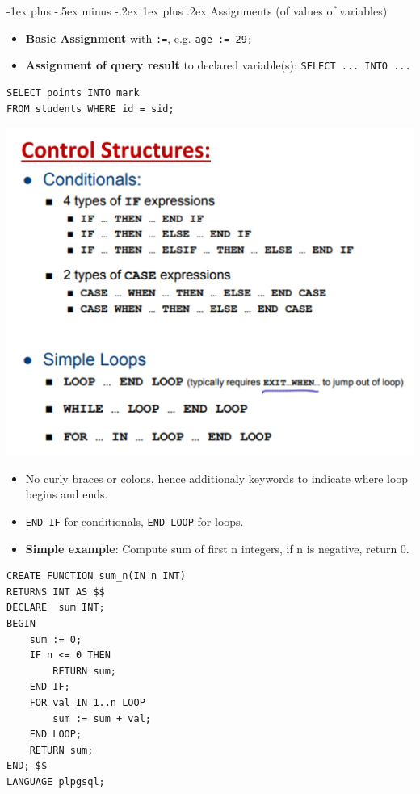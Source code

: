 \documentclass[12pt, landscape]{article}
\makeatletter
\newcommand{\code}[1]{\colorbox{gray!25!}{\lstinline|#1|}}
\renewcommand{\subsubsection}{\@startsection{subsubsection}{3}{0.1mm}%
                                {-1ex plus -.5ex minus -.2ex}%
                                {1ex plus .2ex}%
                                {\normalfont\small\bfseries}}
\makeatother
\begin{document}
\begin{multicols*}{3}
\subsubsection{Assignments (of values of variables)}
\begin{itemize}
\item \textbf{Basic Assignment} with \code{:=}, e.g. \code{age := 29;}
\item \textbf{Assignment of query result} to declared variable(s): \code{SELECT ... INTO ...}
\end{itemize}
\begin{lstlisting}
SELECT points INTO mark 
FROM students WHERE id = sid;
\end{lstlisting}

\centerline{\includegraphics[width=1 \linewidth]{controlstructures}}
\smallskip
\begin{itemize}
\item No curly braces or colons, hence additionaly keywords to indicate where loop begins and ends.
\item \code{END IF} for conditionals, \code{END LOOP} for loops.
\item \textbf{Simple example}: Compute sum of first n integers, if n is negative, return 0.
\end{itemize}

\begin{lstlisting}
CREATE FUNCTION sum_n(IN n INT)
RETURNS INT AS $$
DECLARE  sum INT;
BEGIN
    sum := 0;
    IF n <= 0 THEN 
        RETURN sum; 
    END IF;
    FOR val IN 1..n LOOP
        sum := sum + val;
    END LOOP;
    RETURN sum;
END; $$
LANGUAGE plpgsql;


\end{lstlisting}
\end{multicols*}
\end{document}
